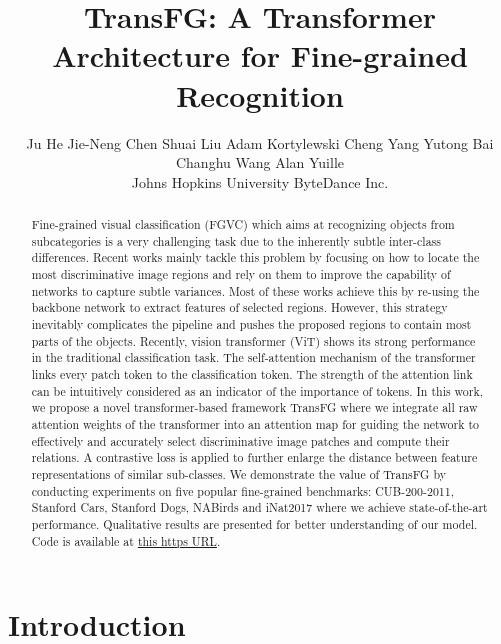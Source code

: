 \documentclass[10pt,twocolumn,letterpaper]{article}
\begin{document}
\title{TransFG: A Transformer Architecture for Fine-grained Recognition}


\author{
	Ju He
	\;\; Jie-Neng Chen
	\;\; Shuai Liu
	\;\; Adam Kortylewski
	\;\; Cheng Yang
	\;\; Yutong Bai\\
	\;\; Changhu Wang
	\;\; Alan Yuille\\
	Johns Hopkins University \;\; ByteDance Inc.\\	
}

\maketitle

\begin{abstract}
    Fine-grained visual classification (FGVC) which aims at recognizing objects from subcategories is a very challenging task due to the inherently subtle inter-class differences. Recent works mainly tackle this problem by focusing on how to locate the most discriminative image regions and rely on them to improve the capability of networks to capture subtle variances. Most of these works achieve this by re-using the backbone network to extract features of selected regions. However, this strategy inevitably complicates the pipeline and pushes the proposed regions to contain most parts of the objects. Recently, vision transformer (ViT) shows its strong performance in the traditional classification task. The self-attention mechanism of the transformer links every patch token to the classification token. The strength of the attention link can be intuitively considered as an indicator of the importance of tokens. In this work, we propose a novel transformer-based framework TransFG where we integrate all raw attention weights of the transformer into an attention map for guiding the network to effectively and accurately select discriminative image patches and compute their relations. A contrastive loss is applied to further enlarge the distance between feature representations of similar sub-classes. We demonstrate the value of TransFG by conducting experiments on five popular fine-grained benchmarks: CUB-200-2011, Stanford Cars, Stanford Dogs, NABirds and iNat2017 where we achieve state-of-the-art performance. Qualitative results are presented for better understanding of our model. Code is available at \href{https://github.com/TACJu/TransFG}{this https URL}.
\end{abstract} \section{Introduction}
\end{document}
